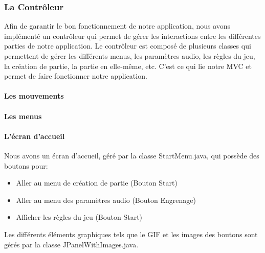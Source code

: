 \subsubsection{La Contrôleur}
\label{subsubsec:controleur}

Afin de garantir le bon fonctionnement de notre application, nous avons implémenté un contrôleur qui permet de gérer les interactions entre les différentes parties de notre application. Le contrôleur est composé de plusieurs classes qui permettent de gérer les différents menus, les paramètres audio, les règles du jeu, la création de partie, la partie en elle-même, etc. C'est ce qui lie notre MVC et permet de faire fonctionner notre application.

\paragraph{Les mouvements}


\paragraph{Les menus}

\paragraph{L'écran d'accueil}

Nous avons un écran d'accueil, géré par la classe StartMenu.java, qui possède des boutons pour:

\begin{itemize}
    \item Aller au menu de création de partie (Bouton Start)
    \item Aller au menu des paramètres audio (Bouton Engrenage)
    \item Afficher les règles du jeu (Bouton Start)
\end{itemize}

Les différents éléments graphiques tels que le GIF et les images des boutons sont gérés par la classe JPanelWithImages.java.

